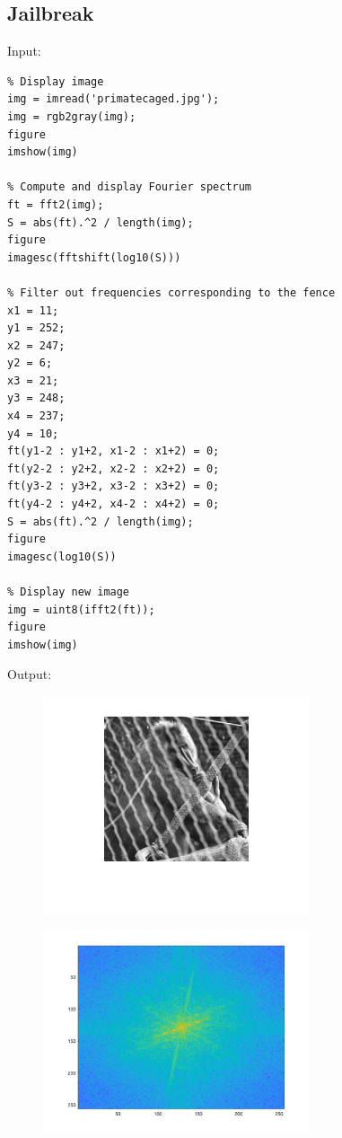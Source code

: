 \documentclass[12pt, a4paper]{article}
\begin{document}
\subsection{Jailbreak}
Input:
\begin{verbatim}
% Display image
img = imread('primatecaged.jpg');
img = rgb2gray(img);
figure
imshow(img)

% Compute and display Fourier spectrum
ft = fft2(img);
S = abs(ft).^2 / length(img);
figure
imagesc(fftshift(log10(S)))

% Filter out frequencies corresponding to the fence
x1 = 11;
y1 = 252;
x2 = 247;
y2 = 6;
x3 = 21;
y3 = 248;
x4 = 237;
y4 = 10;
ft(y1-2 : y1+2, x1-2 : x1+2) = 0;
ft(y2-2 : y2+2, x2-2 : x2+2) = 0;
ft(y3-2 : y3+2, x3-2 : x3+2) = 0;
ft(y4-2 : y4+2, x4-2 : x4+2) = 0;
S = abs(ft).^2 / length(img);
figure
imagesc(log10(S))

% Display new image
img = uint8(ifft2(ft));
figure
imshow(img)
\end{verbatim}
\newpage
Output:
\begin{figure}[H]
    \centering
    \includegraphics[width=0.7\textwidth]{fig28.png}
\end{figure}
\begin{figure}[H]
    \centering
    \includegraphics[width=0.7\textwidth]{fig29.png}
\end{figure}
\end{document}
